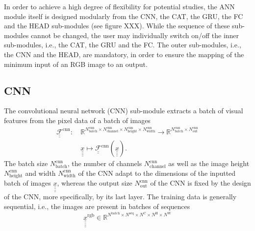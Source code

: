 In order to achieve a high degree of flexibility for potential studies,
the ANN module itself is designed modularly
from the CNN, the CAT, the GRU, the FC and the HEAD sub-modules
(see figure XXX).
While the sequence of these sub-modules cannot be changed,
the user may individually switch on/off the inner sub-modules,
i.e.,
the CAT, the GRU and the FC.
The outer sub-modules,
i.e.,
the CNN and the HEAD,
are mandatory,
in order to ensure the mapping of the minimum input of an RGB image to an output.


\subsection*{CNN}
The convolutional neural network (CNN) sub-module
extracts a batch of visual features 
from the pixel data of a batch of images
\begin{align} \label{eq:CNN}
    \underline{\underline{ \mathcal{F} }}^\text{cnn}
    :\ 
    & 
    \mathbb{R}^{
        N^\text{cnn}_\text{batch} 
        \times
        N^\text{cnn}_\text{channel}
        \times
        N^\text{cnn}_\text{height}
        \times
        N^\text{cnn}_\text{width}
    } 
    \rightarrow 
    \mathbb{R}^{
        N^\text{cnn}_\text{batch}
        \times
        N^\text{cnn}_\text{out}
    }
    \nonumber \\
    &\underline{\underline{\underline{\underline x}}}
    \mapsto 
    \underline{\underline{ \mathcal{F} }}^\text{cnn} \left(
        \underline{\underline{\underline{\underline x}}}
    \right)
    .
\end{align}
The batch size 
$
    N^\text{cnn}_\text{batch}
$,
the number of channels
$
    N^\text{cnn}_\text{channel}
$
as well as the image height 
$
    N^\text{cnn}_\text{height}
$
and width
$
    N^\text{cnn}_\text{width}
$
of the CNN
adapt to the dimensions of the inputted batch of images
$
    \underline{\underline{\underline{\underline x}}}
$,
whereas the output size
$
    N^\text{cnn}_\text{out}
$
of the CNN
is fixed by the design of the CNN, 
more specifically, by its last layer.
The training data is generally sequential,
i.e., the images are present in batches of sequences
\begin{equation}
    \underline{\underline{\underline{\underline{\underline x}}}} ^\text{rgb}
    \in
    \mathbb{R}^{
        N^\text{batch} 
        \times
        N^\text{seq}
        \times
        N^\text{C}
        \times
        N^\text{H}
        \times
        N^\text{W}
    }
\end{equation}

